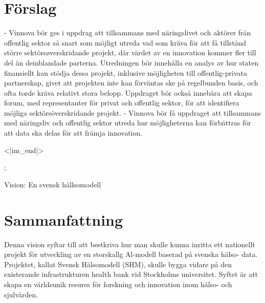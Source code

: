 {{{{{{{{{{{{{{\section*{Förslag}
- Vinnova bör ges i uppdrag att tillsammans med näringslivet och aktörer från offentlig sektor så snart som möjligt utreda vad som kräva för att få tillstånd större sektörsøverskridande projekt, där värdet av en innovation kommer fler till del än deinblandade parterna. Utredningen bör innehålla en analys av hur staten finansiellt kan stödja dessa projekt, inklusive möjligheten till offentlig-privata partnerskap, givet att projekten inte kan förväntas ske på regelbunden basis, och ofta torde kräva relativt stora belopp. Uppdraget bör också innebära att skapa forum, med representanter för privat och offentlig sektor, för att identifiera möjliga sektörsöverskridande projekt.
- Vinnova bör få uppdraget att tillsammans med näringsliv och offentlig sektor utreda hur möjligheterna kan förbättras för att data ska delas för att främja innovation.

<|im_end|>};

Vision: En svensk hällsomodell
\section*{Sammanfattning}
Denna vision syftar till att bestkriva hur man skulle kunna inritta ett nationellt projekt för utveckling av en storskallg Al-modell baserad på svenska hälso-
data. Projektet, kallat Svensk Hälsomodell (SHM), skulle bygga vidare på den existerande infrastrukturen health bank vid Stockholms universitet. Syftet är att skapa en världsunik resures för forskning och innovation inom hälso- och sjulvården.
}}}}}}}}}}}}}
